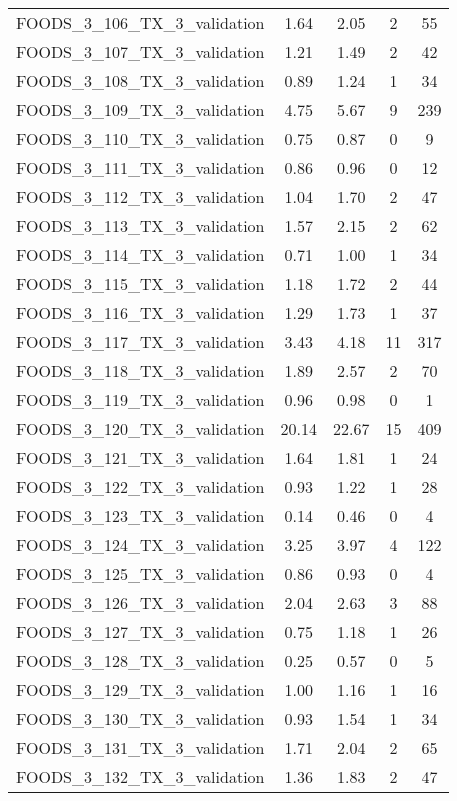 \begin{table}
\begin{tabular}{|l|c|c|c|c|}
FOODS\_3\_106\_TX\_3\_validation & 1.64 & 2.05 & 2 & 55 \\
FOODS\_3\_107\_TX\_3\_validation & 1.21 & 1.49 & 2 & 42 \\
FOODS\_3\_108\_TX\_3\_validation & 0.89 & 1.24 & 1 & 34 \\
FOODS\_3\_109\_TX\_3\_validation & 4.75 & 5.67 & 9 & 239 \\
FOODS\_3\_110\_TX\_3\_validation & 0.75 & 0.87 & 0 & 9 \\
FOODS\_3\_111\_TX\_3\_validation & 0.86 & 0.96 & 0 & 12 \\
FOODS\_3\_112\_TX\_3\_validation & 1.04 & 1.70 & 2 & 47 \\
FOODS\_3\_113\_TX\_3\_validation & 1.57 & 2.15 & 2 & 62 \\
FOODS\_3\_114\_TX\_3\_validation & 0.71 & 1.00 & 1 & 34 \\
FOODS\_3\_115\_TX\_3\_validation & 1.18 & 1.72 & 2 & 44 \\
FOODS\_3\_116\_TX\_3\_validation & 1.29 & 1.73 & 1 & 37 \\
FOODS\_3\_117\_TX\_3\_validation & 3.43 & 4.18 & 11 & 317 \\
FOODS\_3\_118\_TX\_3\_validation & 1.89 & 2.57 & 2 & 70 \\
FOODS\_3\_119\_TX\_3\_validation & 0.96 & 0.98 & 0 & 1 \\
FOODS\_3\_120\_TX\_3\_validation & 20.14 & 22.67 & 15 & 409 \\
FOODS\_3\_121\_TX\_3\_validation & 1.64 & 1.81 & 1 & 24 \\
FOODS\_3\_122\_TX\_3\_validation & 0.93 & 1.22 & 1 & 28 \\
FOODS\_3\_123\_TX\_3\_validation & 0.14 & 0.46 & 0 & 4 \\
FOODS\_3\_124\_TX\_3\_validation & 3.25 & 3.97 & 4 & 122 \\
FOODS\_3\_125\_TX\_3\_validation & 0.86 & 0.93 & 0 & 4 \\
FOODS\_3\_126\_TX\_3\_validation & 2.04 & 2.63 & 3 & 88 \\
FOODS\_3\_127\_TX\_3\_validation & 0.75 & 1.18 & 1 & 26 \\
FOODS\_3\_128\_TX\_3\_validation & 0.25 & 0.57 & 0 & 5 \\
FOODS\_3\_129\_TX\_3\_validation & 1.00 & 1.16 & 1 & 16 \\
FOODS\_3\_130\_TX\_3\_validation & 0.93 & 1.54 & 1 & 34 \\
FOODS\_3\_131\_TX\_3\_validation & 1.71 & 2.04 & 2 & 65 \\
FOODS\_3\_132\_TX\_3\_validation & 1.36 & 1.83 & 2 & 47 \\

\end{tabular}
\end{table}
